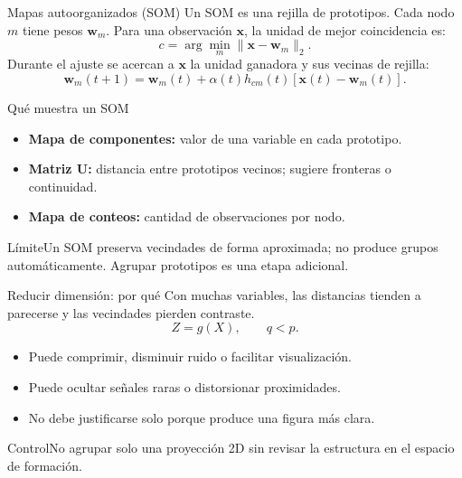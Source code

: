 \documentclass[aspectratio=169,10pt]{beamer}
\newcommand{\concepto}[1]{\textcolor{UAPTeal}{\textbf{#1}}}
\begin{document}
\begin{frame}{Mapas autoorganizados (SOM)}
  \small
  Un SOM es una rejilla de prototipos. Cada nodo $m$ tiene pesos $\mathbf{w}_m$.
  Para una observación $\mathbf{x}$, la unidad de mejor coincidencia es:
  \[c=\arg\min_m\|\mathbf{x}-\mathbf{w}_m\|_2.\]
  Durante el ajuste se acercan a $\mathbf{x}$ la unidad ganadora y sus vecinas de rejilla:
  \[\mathbf{w}_m(t+1)=\mathbf{w}_m(t)+\alpha(t)h_{cm}(t)[\mathbf{x}(t)-\mathbf{w}_m(t)].\]
\end{frame}

\begin{frame}{Qué muestra un SOM}
  \small
  \begin{itemize}
    \item \concepto{Mapa de componentes:} valor de una variable en cada prototipo.
    \item \concepto{Matriz U:} distancia entre prototipos vecinos; sugiere fronteras o continuidad.
    \item \concepto{Mapa de conteos:} cantidad de observaciones por nodo.
  \end{itemize}
  \begin{block}{Límite}Un SOM preserva vecindades de forma aproximada; no produce grupos automáticamente. Agrupar prototipos es una etapa adicional.\end{block}
\end{frame}

\begin{frame}{Reducir dimensión: por qué}
  \small
  Con muchas variables, las distancias tienden a parecerse y las vecindades pierden contraste.
  \[Z=g(X),\qquad q<p.\]
  \begin{itemize}
    \item Puede comprimir, disminuir ruido o facilitar visualización.
    \item Puede ocultar señales raras o distorsionar proximidades.
    \item No debe justificarse solo porque produce una figura más clara.
  \end{itemize}
  \begin{alertblock}{Control}No agrupar solo una proyección 2D sin revisar la estructura en el espacio de formación.\end{alertblock}
\end{frame}
\end{document}
